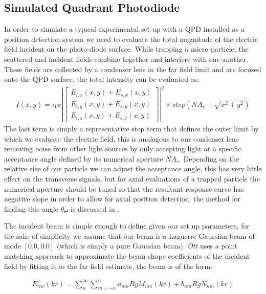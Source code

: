 \documentclass[a4paper,oneside,11pt]{book}
\begin{document}
\subsection{Simulated Quadrant Photodiode}
In order to simulate a typical experimental set up with a QPD installed as a position detection system we need to evaluate the total magnitude of the electric field incident on the photo-diode surface. While trapping a micro-particle, the scattered and incident fields combine together and interfere with one another. These fields are collected by a condenser lens in the far field limit and are focused onto the QPD surface, the total intensity can be evaluated as:
\begin{align}
I(x,y) = \epsilon_0c\left|
\begin{bmatrix} 
	E_{i,x}(x,y)+E_{s,x}(x,y) \\ 
	E_{i,y}(x,y)+E_{s,y}(x,y) \\ 
	E_{i,z}(x,y)+E_{s,z}(x,y)
\end{bmatrix} \right|^2 \times step(NA_c-\sqrt{x^2+y^2})
\end{align}
The last term is simply a representative step term that defines the outer limit by which we evaluate the electric field, this is analogous to our condenser lens removing noise from other light sources by only accepting light at a specific acceptance angle defined by its numerical aperture $NA_c$. Depending on the relative size of our particle we can adjust the acceptance angle, this has very little effect on the transverse signals, but for axial evaluations of a trapped particle the numerical aperture should be tuned so that the resultant response curve has negative slope in order to allow for axial position detection, the method for finding this angle $\theta_\Theta$ is discussed in \cite{Friedrich2012}.

The incident beam is simple enough to define given our set up parameters, for the sake of simplicity we assume that our beam is a Laguerre-Gaussian beam of mode $[0.0, 0.0]$ (which is simply a pure Gaussian beam). \textit{Ott} uses a point matching approach to approximate the beam shape coefficients of the incident field by fitting it to the far field estimate, the beam is of the form:

\begin{align}
	E_{inc}(kr)=\sum^\infty_n\sum^n_{m=-n}a_{mn}RgM_{nm}(kr)+b_{nm}RgN_{nm}(kr)
\end{align}
\end{document}
